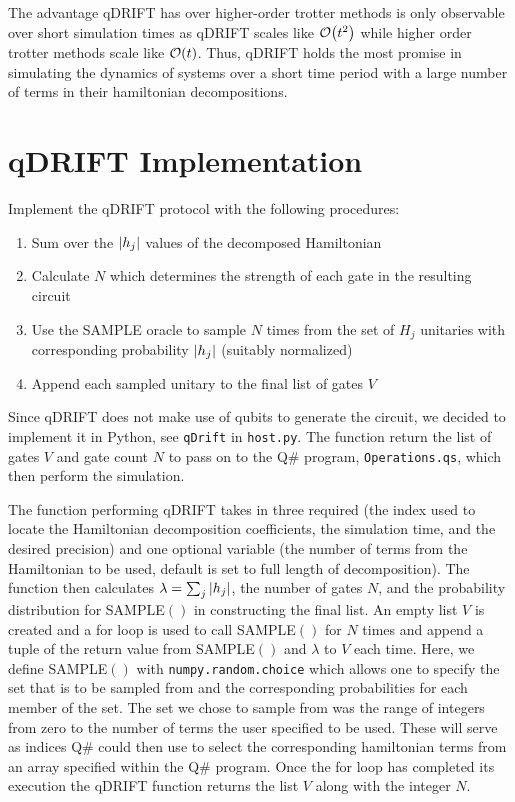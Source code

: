 \documentclass[letterpaper, 11pt]{article}
\begin{document}
The advantage qDRIFT has over higher-order trotter methods is only observable over short simulation times as qDRIFT scales like $\order{t^2}$ while higher order trotter methods scale like $\order{t}$. Thus, qDRIFT holds the most promise in simulating the dynamics of systems over a short time period with a large number of terms in their hamiltonian decompositions. 

\section*{qDRIFT Implementation}
Implement the qDRIFT protocol with the following procedures:

\begin{enumerate}
    \item Sum over the $\abs{h_j}$ values of the decomposed Hamiltonian
    \item Calculate $N$ which determines the strength of each gate in the resulting circuit
    \item Use the SAMPLE oracle to sample $N$ times from the set of $H_j$ unitaries with corresponding probability $\abs{h_j}$ (suitably normalized)
    \item Append each sampled unitary to the final list of gates $V$
\end{enumerate}

Since qDRIFT does not make use of qubits to generate the circuit, we decided to implement it in Python, see \texttt{qDrift} in \texttt{host.py}. The function return the list of gates $V$ and gate count $N$ to pass on to the Q\# program, \texttt{Operations.qs}, which then perform the simulation. 

The function performing qDRIFT takes in three required (the index used to locate the Hamiltonian decomposition coefficients, the simulation time, and the desired precision) and one optional variable (the number of terms from the Hamiltonian to be used, default is set to full length of decomposition). The function then calculates $\lambda = \sum_j \abs{h_j}$, the number of gates $N$, and the probability distribution for SAMPLE$()$ in constructing the final list. An empty list $V$ is created and a for loop is used to call SAMPLE$()$ for $N$ times and append a tuple of the return value from SAMPLE$()$ and $\lambda$ to $V$ each time. Here, we define SAMPLE$()$ with \texttt{numpy.random.choice} which allows one to specify the set that is to be sampled from and the corresponding probabilities for each member of the set. The set we chose to sample from was the range of integers from zero to the number of terms the user specified to be used. These will serve as indices Q\# could then use to select the corresponding hamiltonian terms from an array specified within the Q\# program. Once the for loop has completed its execution the qDRIFT function returns the list $V$ along with the integer $N$.      
\end{document}
